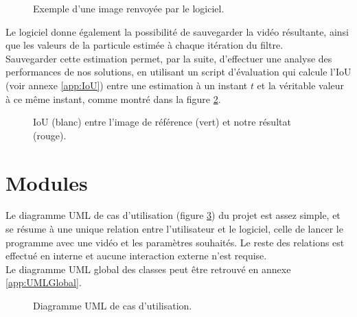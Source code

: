 \begin{figure}[!htbp]
\center
\caption{Exemple d'une image renvoyée par le logiciel.}
\label{fig:soft_result}
\end{figure}
\FloatBarrier

Le logiciel donne également la possibilité de sauvegarder la vidéo résultante, ainsi que les valeurs de la particule estimée à chaque itération du filtre.\\
Sauvegarder cette estimation permet, par la suite, d'effectuer une analyse des performances de nos solutions, en utilisant un script d'évaluation qui calcule l'IoU (voir annexe \ref{app:IoU}) entre une estimation à un instant $t$ et la véritable valeur à ce même instant, comme montré dans la figure \ref{fig:eval_result}.\\

\begin{figure}[!htbp]
\center
\caption{IoU (blanc) entre l'image de référence (vert) et notre résultat (rouge).}
\label{fig:eval_result}
\end{figure}
\FloatBarrier


\clearpage
\section{Modules}
Le diagramme UML de cas d'utilisation (figure \ref{fig:uml_diagram_usecase}) du projet est assez simple, et se résume à une unique relation entre l'utilisateur et le logiciel, celle de lancer le programme avec une vidéo et les paramètres souhaités. Le reste des relations est effectué en interne et aucune interaction externe n'est requise.\\
Le diagramme UML global des classes peut être retrouvé en annexe \ref{app:UMLGlobal}.

\begin{figure}[!htbp]
\center
\caption{Diagramme UML de cas d'utilisation.}
\label{fig:uml_diagram_usecase}
\end{figure}
\FloatBarrier


